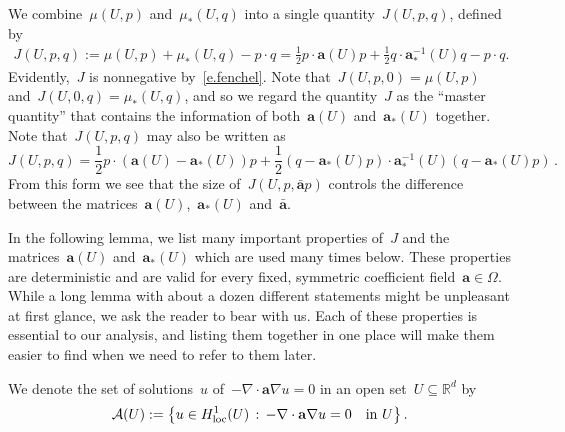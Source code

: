 \documentclass[11pt,twoside]{article} %
\numberwithin{equation}{section}
\theoremstyle{definition}
\let\originalleft\left
\let\originalright\right
\renewcommand{\left}{\mathopen{}\mathclose\bgroup\originalleft}
\renewcommand{\right}{\aftergroup\egroup\originalright}
\newcommand*{\Rd}{\ensuremath{\mathbb{R}^d}}
\renewcommand{\a}{\mathbf{a}}
\newcommand{\ahom}{\bar{\a}}
\begin{document}
\smallskip

We combine~$\mu(U,p)$ and~$\mu_*(U,q)$ into a single quantity~$J(U,p,q)$, defined by
\begin{align}
\label{e.Jaas}
J(U,p,q) 
:=
\mu(U,p) + \mu_*(U,q) - p\cdot q
=
\frac12p\cdot \a(U) p + \frac12 q\cdot \a_*^{-1}(U)q - p\cdot q. 
\end{align}
Evidently,~$J$ is nonnegative by~\eqref{e.fenchel}. Note that~$J(U,p,0) = \mu(U,p)$ and~$J(U,0,q) = \mu_*(U,q)$, and so we regard the quantity~$J$ as the ``master quantity'' that contains the information of both~$\a(U)$ and~$\a_*(U)$ together. 
Note that~$J(U,p,q)$ may also be written as
\begin{equation}
\label{e.magic}
J(U,p,q) 
= 
\frac12 p \cdot (\a(U) - \a_*(U)) p  +   \frac12 (q  - \a_*(U) p) \cdot \a_*^{-1}(U) (q  - \a_*(U)  p)
\,.
\end{equation}
From this form we see that the size of~$J(U,p,\ahom p)$ controls the difference between the matrices~$\a (U)$,~$\a_*(U)$ and~$\ahom$. 

\smallskip

In the following lemma, we list many important properties of~$J$ and the matrices~$\a(U)$ and~$\a_*(U)$ which are used many times below. These properties are deterministic and are valid for every fixed, symmetric coefficient field~$\a\in\Omega$. While a long lemma with about a dozen different statements might be unpleasant at first glance, we ask the reader to bear with us. Each of these properties is essential to our analysis, and listing them together in one place will make them easier to find when we need to refer to them later. 

\smallskip

We denote the set of solutions~$u$ of~$-\nabla \cdot \a\nabla u=0$ in an open set~$U\subseteq\Rd$ by 
\begin{equation}
\label{e.def.AU}
\mathcal{A}(U) := 
\left\{ 
u\in H^1_{\mathrm{loc}}(U)
\,:\,
-\nabla \cdot \a\nabla u = 0 \quad \mbox{in} \ U \right\}
\,.
\end{equation}
\end{document}
